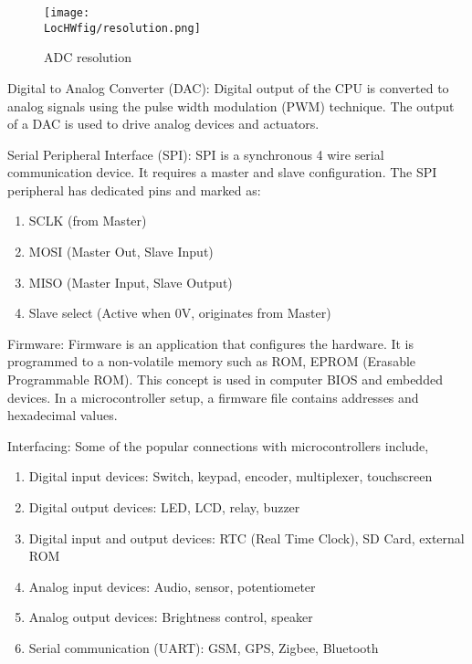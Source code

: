 \begin{description}
        \begin{figure}
          \centering
          \texttt{[image: \\LocHWfig/resolution.png]}
          \caption{ADC resolution}
          \label{resolution}
        \end{figure}

  \item {Digital to Analog Converter (DAC):} Digital output of the CPU is
        converted to analog signals using the pulse width modulation (PWM)
        technique. The output of a DAC is used to drive analog devices and actuators.

  \item {Serial Peripheral Interface (SPI):} SPI is a synchronous 4 wire
        serial communication device. It requires a master and slave
        configuration. The SPI peripheral has dedicated pins and marked
        as:
        \begin{enumerate}
          \item SCLK (from Master)
          \item MOSI (Master Out, Slave Input)
          \item MISO (Master Input, Slave Output)
          \item Slave select (Active when 0V, originates from Master)
        \end{enumerate}

  \item {Firmware:} Firmware is an application that configures the
        hardware. It is programmed to a non-volatile memory such as ROM,
        EPROM (Erasable Programmable ROM). This concept is used in computer
        BIOS and embedded devices.  In a microcontroller setup, a firmware
        file contains addresses and hexadecimal values.

  \item{Interfacing:} Some of the popular connections with microcontrollers include,
        \begin{enumerate}
          \item Digital input devices: Switch, keypad, encoder, multiplexer,
                touchscreen
          \item Digital output devices: LED, LCD, relay, buzzer
          \item Digital input and output devices: RTC (Real Time Clock),
                SD Card, external ROM
          \item Analog input devices: Audio, sensor, potentiometer
          \item Analog output devices: Brightness control, speaker
          \item Serial communication (UART): GSM, GPS, Zigbee, Bluetooth
        \end{enumerate}
\end{description}

